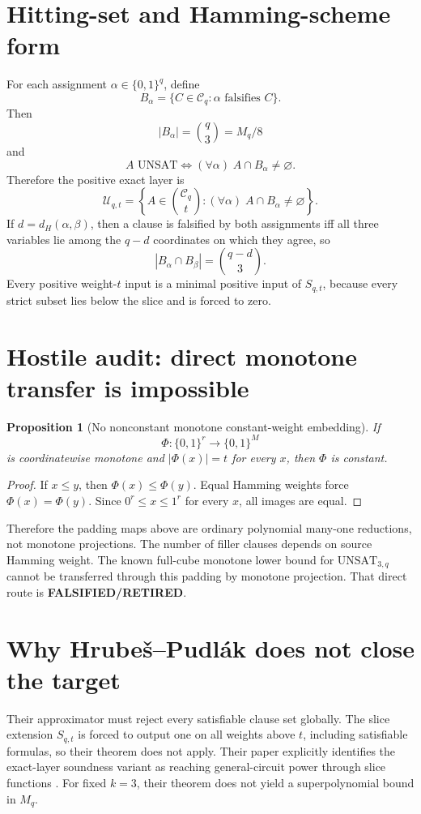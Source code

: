 \documentclass[11pt]{article}
\newtheorem{proposition}{Proposition}
\begin{document}
\section{Hitting-set and Hamming-scheme form}
For each assignment \(\alpha\in\{0,1\}^q\), define
\[
B_\alpha=\{C\in\mathcal C_q:\alpha\text{ falsifies }C\}.
\]
Then
\[
|B_\alpha|=\binom q3=M_q/8
\]
and
\[
A\text{ UNSAT}\iff(\forall\alpha)\;A\cap B_\alpha\ne\varnothing.
\]
Therefore the positive exact layer is
\[
\mathcal U_{q,t}
=
\left\{
A\in\binom{\mathcal C_q}{t}:
(\forall\alpha)\;A\cap B_\alpha\ne\varnothing
\right\}.
\]
If \(d=d_H(\alpha,\beta)\), then a clause is falsified by both assignments iff all three variables lie among the \(q-d\) coordinates on which they agree, so
\[
|B_\alpha\cap B_\beta|=\binom{q-d}{3}.
\]
Every positive weight-\(t\) input is a minimal positive input of \(S_{q,t}\), because every strict subset lies below the slice and is forced to zero.

\section{Hostile audit: direct monotone transfer is impossible}
\begin{proposition}[No nonconstant monotone constant-weight embedding]
If
\[
\Phi:\{0,1\}^r\to\{0,1\}^M
\]
is coordinatewise monotone and \(|\Phi(x)|=t\) for every \(x\), then \(\Phi\) is constant.
\end{proposition}
\begin{proof}
If \(x\le y\), then \(\Phi(x)\le\Phi(y)\). Equal Hamming weights force \(\Phi(x)=\Phi(y)\). Since \(0^r\le x\le1^r\) for every \(x\), all images are equal.
\end{proof}

Therefore the padding maps above are ordinary polynomial many-one reductions, not monotone projections. The number of filler clauses depends on source Hamming weight. The known full-cube monotone lower bound for \(\mathrm{UNSAT}_{3,q}\) cannot be transferred through this padding by monotone projection. That direct route is \textbf{FALSIFIED/RETIRED}.

\section{Why Hrube\v{s}--Pudl\'ak does not close the target}
Their approximator must reject every satisfiable clause set globally. The slice extension \(S_{q,t}\) is forced to output one on all weights above \(t\), including satisfiable formulas, so their theorem does not apply. Their paper explicitly identifies the exact-layer soundness variant as reaching general-circuit power through slice functions \cite{HrubesPudlak2017}. For fixed \(k=3\), their theorem does not yield a superpolynomial bound in \(M_q\).
\end{document}
